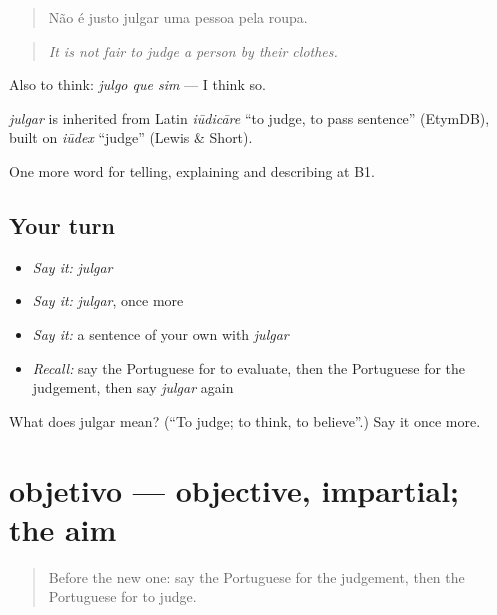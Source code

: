\begin{quote}
Não é justo julgar uma pessoa pela roupa.
\end{quote}

\begin{quote}
\emph{It is not fair to judge a person by their clothes.}
\end{quote}

Also to think: \emph{julgo que sim} — I think so.

\begin{cousinweb}
\emph{julgar} is inherited from Latin \emph{iūdicāre} \textquotedblleft{}to judge, to pass sentence\textquotedblright{} (EtymDB), built on \emph{iūdex} \textquotedblleft{}judge\textquotedblright{} (Lewis \& Short).
\end{cousinweb}

\begin{grammarlens}[title={What you've built}]
One more word for telling, explaining and describing at B1.
\end{grammarlens}

\subsection*{Your turn}
\begin{itemize}
\raggedright
  \item \emph{Say it:} \emph{julgar}
  \item \emph{Say it:} \emph{julgar}, once more
  \item \emph{Say it:} a sentence of your own with \emph{julgar}
  \item \emph{Recall:} say the Portuguese for to evaluate, then the Portuguese for the judgement, then say \emph{julgar} again
\end{itemize}

\begin{tcolorbox}[breakable,colback=teal!4,colframe=teal!35!black,title={Before you move on}]
What does julgar mean? (\textquotedblleft{}To judge; to think, to believe\textquotedblright{}.) Say it once more.
\end{tcolorbox}
\section[objetivo]{objetivo — objective, impartial; the aim}

\label{lesson:PT-C344-objetivo}



\begin{quote}
Before the new one: say the Portuguese for the judgement, then the Portuguese for to judge.
\end{quote}

